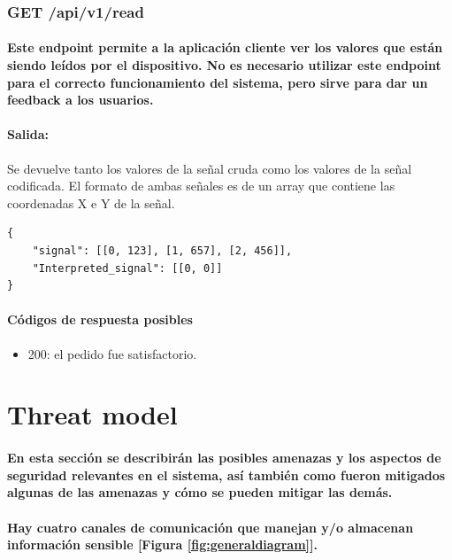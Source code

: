 \documentclass{article}
\begin{document}
\subsubsection{GET /api/v1/read}
\paragraph{
Este endpoint permite a la aplicación cliente ver los valores que están siendo leídos por el dispositivo. No es necesario utilizar este endpoint para el correcto funcionamiento del sistema, pero sirve para dar un feedback a los usuarios.
}
\paragraph{
\textbf{Salida}:
}
Se devuelve tanto los valores de la señal cruda como los valores de la señal codificada. El formato de ambas señales es de un array que contiene las coordenadas X e Y de la señal.


\begin{verbatim}
{
    "signal": [[0, 123], [1, 657], [2, 456]],
    "Interpreted_signal": [[0, 0]]
}

\end{verbatim}
\paragraph{
Códigos de respuesta posibles
}
\begin{itemize}
    \item 200: el pedido fue satisfactorio.
\end{itemize}

\section{Threat model}
\paragraph{
En esta sección se describirán las posibles amenazas y los aspectos de seguridad relevantes en el sistema, así también como fueron mitigados algunas de las amenazas y cómo se pueden mitigar las demás.
}
\paragraph{
Hay cuatro canales de comunicación que manejan y/o almacenan información sensible [Figura \ref{fig:generaldiagram}].
}
\end{document}

